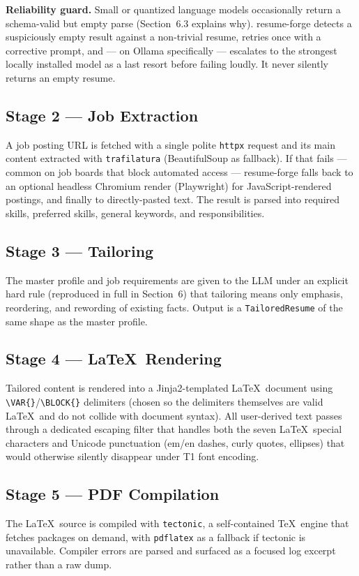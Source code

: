 \documentclass[10.5pt,letterpaper]{article}
\begin{document}
\begin{calloutbox}
\textbf{Reliability guard.} Small or quantized language models occasionally return a
schema-valid but empty parse (Section~6.3 explains why). resume-forge detects a suspiciously
empty result against a non-trivial resume, retries once with a corrective prompt, and --- on
Ollama specifically --- escalates to the strongest locally installed model as a last resort
before failing loudly. It never silently returns an empty resume.
\end{calloutbox}

\subsection{Stage 2 --- Job Extraction}
A job posting URL is fetched with a single polite \texttt{httpx} request and its main content
extracted with \texttt{trafilatura} (BeautifulSoup as fallback). If that fails --- common on
job boards that block automated access --- resume-forge falls back to an optional headless
Chromium render (Playwright) for JavaScript-rendered postings, and finally to
directly-pasted text. The result is parsed into required skills, preferred skills, general
keywords, and responsibilities.

\subsection{Stage 3 --- Tailoring}
The master profile and job requirements are given to the LLM under an explicit hard rule
(reproduced in full in Section~6) that tailoring means only emphasis, reordering, and
rewording of existing facts. Output is a \texttt{TailoredResume} of the same shape as the
master profile.

\subsection{Stage 4 --- \LaTeX\ Rendering}
Tailored content is rendered into a Jinja2-templated \LaTeX\ document using
\texttt{\textbackslash VAR\{\}}/\texttt{\textbackslash BLOCK\{\}} delimiters (chosen so the
delimiters themselves are valid \LaTeX\ and do not collide with document syntax). All
user-derived text passes through a dedicated escaping filter that handles both the seven
\LaTeX\ special characters and Unicode punctuation (em/en dashes, curly quotes, ellipses)
that would otherwise silently disappear under T1 font encoding.

\subsection{Stage 5 --- PDF Compilation}
The \LaTeX\ source is compiled with \texttt{tectonic}, a self-contained \TeX\ engine that
fetches packages on demand, with \texttt{pdflatex} as a fallback if tectonic is unavailable.
Compiler errors are parsed and surfaced as a focused log excerpt rather than a raw dump.
\end{document}
